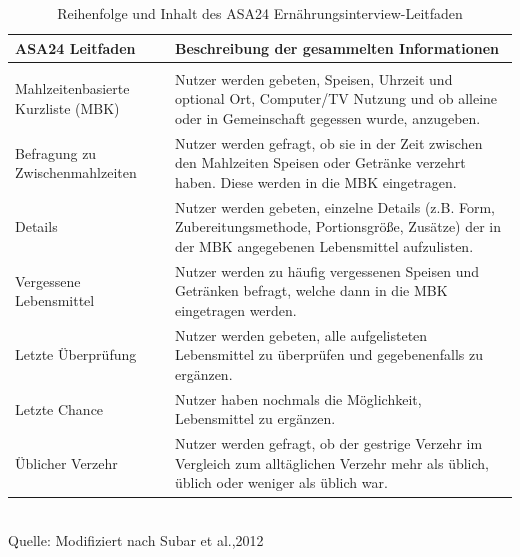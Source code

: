 

\begin{table}[!h]
\begin{flushleft}
\caption{ Reihenfolge und Inhalt des ASA24 Ernährungsinterview-Leitfaden}
\end{flushleft}
\begin{tabular}{l p{8cm}}
ASA24 Leitfaden & Beschreibung der gesammelten Informationen \\
\hline\\

Mahlzeitenbasierte Kurzliste (MBK) &
Nutzer werden gebeten, Speisen, Uhrzeit und optional Ort, Computer/TV Nutzung und ob alleine oder in Gemeinschaft gegessen wurde, anzugeben. \\

Befragung zu Zwischenmahlzeiten &
Nutzer werden gefragt, ob sie in der Zeit zwischen den Mahlzeiten Speisen oder Getränke verzehrt haben.  Diese werden in die MBK eingetragen.\\

Details &
Nutzer werden gebeten, einzelne Details (z.B.  Form, Zubereitungsmethode, Portionsgröße, Zusätze) der in der MBK angegebenen Lebensmittel aufzulisten. \\

Vergessene Lebensmittel &
Nutzer werden zu häufig vergessenen Speisen und Getränken befragt, welche dann in die MBK eingetragen werden.\\

Letzte Überprüfung &
Nutzer werden gebeten, alle aufgelisteten Lebensmittel zu überprüfen und gegebenenfalls zu ergänzen.\\

Letzte Chance &
Nutzer haben nochmals die Möglichkeit, Lebensmittel zu ergänzen.\\

Üblicher Verzehr &
Nutzer werden gefragt, ob der gestrige Verzehr im Vergleich zum alltäglichen Verzehr mehr als üblich, üblich oder weniger als üblich war.\\


\end{tabular}
\\Quelle: Modifiziert nach Subar et al.,2012
\end{table}





